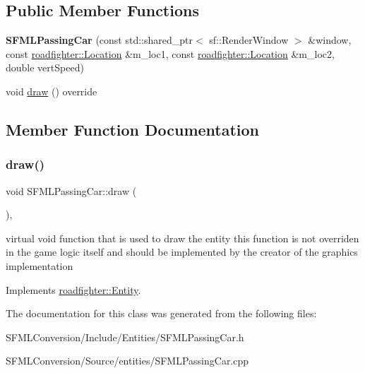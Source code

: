 \subsection*{Public Member Functions}
\begin{DoxyCompactItemize}
\item 
\mbox{\label{classSFMLPassingCar_a8011df3b42eb3b0fa11c7a55f9ac5400}} 
{\bfseries S\+F\+M\+L\+Passing\+Car} (const std\+::shared\+\_\+ptr$<$ sf\+::\+Render\+Window $>$ \&window, const \hyperlink{classroadfighter_1_1Location}{roadfighter\+::\+Location} \&m\+\_\+loc1, const \hyperlink{classroadfighter_1_1Location}{roadfighter\+::\+Location} \&m\+\_\+loc2, double vert\+Speed)
\item 
void \hyperlink{classSFMLPassingCar_ad860ff5f0eea98fffaa51381c9424e8d}{draw} () override
\end{DoxyCompactItemize}


\subsection{Member Function Documentation}
\mbox{\label{classSFMLPassingCar_ad860ff5f0eea98fffaa51381c9424e8d}} 
\subsubsection{\texorpdfstring{draw()}{draw()}}
{\footnotesize\ttfamily void S\+F\+M\+L\+Passing\+Car\+::draw (\begin{DoxyParamCaption}{ }\end{DoxyParamCaption})\hspace{0.3cm}{\ttfamily [override]}, {\ttfamily [virtual]}}

virtual void function that is used to draw the entity this function is not overriden in the game logic itself and should be implemented by the creator of the graphics implementation 

Implements \hyperlink{classroadfighter_1_1Entity_ac516f8005f969ad5a86c252e5a3640ee}{roadfighter\+::\+Entity}.



The documentation for this class was generated from the following files\+:\begin{DoxyCompactItemize}
\item 
S\+F\+M\+L\+Conversion/\+Include/\+Entities/S\+F\+M\+L\+Passing\+Car.\+h\item 
S\+F\+M\+L\+Conversion/\+Source/entities/S\+F\+M\+L\+Passing\+Car.\+cpp\end{DoxyCompactItemize}
